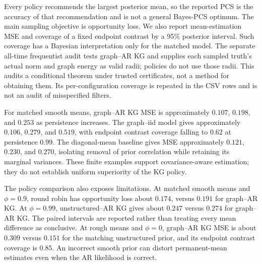 \documentclass[11pt]{article}
\begin{document}
Every policy recommends the largest posterior mean, so the reported PCS is the accuracy of that recommendation and is not a general Bayes-PCS optimum. The main sampling objective is opportunity loss. We also report mean-estimation MSE and coverage of a fixed endpoint contrast by a 95\% posterior interval. Such coverage has a Bayesian interpretation only for the matched model. The separate all-time frequentist audit tests graph--AR KG and supplies each sampled truth's actual norm and graph energy as valid radii; policies do not use those radii. This audits a conditional theorem under trusted certificates, not a method for obtaining them. Its per-configuration coverage is repeated in the CSV rows and is not an audit of misspecified filters.

\begin{table}[p]
\centering\small

\caption{Permanent-mean experiment: expected opportunity cost (EOC), PCS of the largest-posterior-mean recommendation, and MSE per mean. Each entry uses 200 paired runs, budget 48, and six locations. Standard errors, variance-matched diagonal-prior comparisons, wrong-graph comparisons, coverage, and paired uncertainty are supplied in the accompanying CSVs and findings.}
\label{tab:experiment}
\end{table}

For matched smooth means, graph--AR KG MSE is approximately $0.107$, $0.198$, and $0.253$ as persistence increases. The graph--iid model gives approximately $0.106$, $0.279$, and $0.519$, with endpoint contrast coverage falling to $0.62$ at persistence $0.99$. The diagonal-mean baseline gives MSE approximately $0.121$, $0.230$, and $0.270$, isolating removal of prior correlation while retaining its marginal variances. These finite examples support covariance-aware estimation; they do not establish uniform superiority of the KG policy.

The policy comparison also exposes limitations. At matched smooth means and $\phi=0.9$, round robin has opportunity loss about $0.174$, versus $0.191$ for graph--AR KG. At $\phi=0.99$, unstructured--AR KG gives about $0.247$ versus $0.274$ for graph--AR KG. The paired intervals are reported rather than treating every mean difference as conclusive. At rough means and $\phi=0$, graph--AR KG MSE is about $0.309$ versus $0.151$ for the matching unstructured prior, and its endpoint contrast coverage is $0.85$. An incorrect smooth prior can distort permanent-mean estimates even when the AR likelihood is correct.
\end{document}

